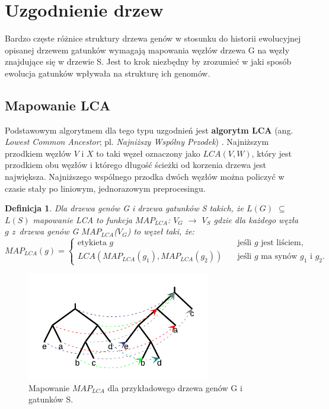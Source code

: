 \documentclass[licencjacka]{pracamgr}
\newtheorem{defi}{Definicja}[section]
\begin{document}
\section{Uzgodnienie drzew}
Bardzo częste różnice struktury drzewa genów w stosunku do historii ewolucyjnej opisanej drzewem gatunków wymagają mapowania węzłów drzewa G na węzły znajdujące się w drzewie S. Jest to krok niezbędny by zrozumieć w jaki sposób ewolucja gatunków wpływała na strukturę ich genomów. 

\subsection{Mapowanie LCA}
Podstawowym algorytmem dla tego typu uzgodnień jest \textbf{algorytm LCA} (ang. \textit{Lowest Common Ancestor}; pl. \textit{Najniższy Wspólny Przodek}) \cite{lca}. Najniższym przodkiem węzłów $V$ i $X$ to taki węzeł oznaczony jako $LCA(V,W)$, który jest przodkiem obu węzłów i którego długość ścieżki od korzenia drzewa jest największa. Najniższego wspólnego przodka dwóch węzłów można policzyć w czasie stały po liniowym, jednorazowym preprocesingu. 

\begin{defi}
Dla drzewa genów G i drzewa gatunków S takich, że $L(G)$ $\subseteq$ $L(S)$ mapowanie LCA to funkcja $MAP_{LCA}$: $V_G$ $\rightarrow$ $V_S$ gdzie dla każdego węzła $g$ z~drzewa genów G $MAP_{LCA}$($V_G$) to węzeł taki, że:
\[ MAP_{LCA}(g) =
  \begin{cases}
    \text{etykieta }g       & \quad \text{jeśli } g \text{ jest liściem,}\\
    LCA(MAP_{LCA}(g_1),MAP_{LCA}(g_2))  & \quad \text{jeśli } g \text{ ma synów } g_1 \text{ i } g_2.
  \end{cases}
\]
\end{defi}

\begin{figure}[H]
  \centering
  \includegraphics[width=80mm]{./pictures/mapping.pdf}
  \caption{Mapowanie $MAP_{LCA}$ dla przykładowego drzewa genów G i gatunków S.}
\end{figure}
\end{document}
